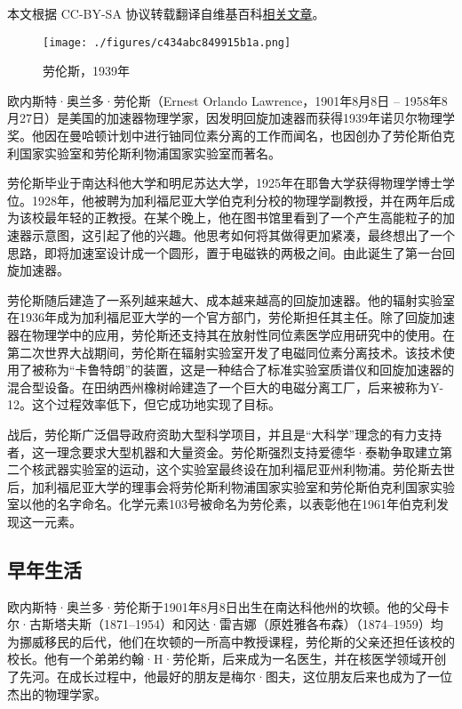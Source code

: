 
本文根据 CC-BY-SA 协议转载翻译自维基百科\href{https://en.wikipedia.org/wiki/Ernest_Lawrence}{相关文章}。

\begin{figure}[ht]
\centering
\texttt{[image: ./figures/c434abc849915b1a.png]}
\caption{劳伦斯，1939年} \label{fig_ONST_8}
\end{figure}
欧内斯特·奥兰多·劳伦斯（Ernest Orlando Lawrence，1901年8月8日 – 1958年8月27日）是美国的加速器物理学家，因发明回旋加速器而获得1939年诺贝尔物理学奖。他因在曼哈顿计划中进行铀同位素分离的工作而闻名，也因创办了劳伦斯伯克利国家实验室和劳伦斯利物浦国家实验室而著名。

劳伦斯毕业于南达科他大学和明尼苏达大学，1925年在耶鲁大学获得物理学博士学位。1928年，他被聘为加利福尼亚大学伯克利分校的物理学副教授，并在两年后成为该校最年轻的正教授。在某个晚上，他在图书馆里看到了一个产生高能粒子的加速器示意图，这引起了他的兴趣。他思考如何将其做得更加紧凑，最终想出了一个思路，即将加速室设计成一个圆形，置于电磁铁的两极之间。由此诞生了第一台回旋加速器。

劳伦斯随后建造了一系列越来越大、成本越来越高的回旋加速器。他的辐射实验室在1936年成为加利福尼亚大学的一个官方部门，劳伦斯担任其主任。除了回旋加速器在物理学中的应用，劳伦斯还支持其在放射性同位素医学应用研究中的使用。在第二次世界大战期间，劳伦斯在辐射实验室开发了电磁同位素分离技术。该技术使用了被称为“卡鲁特朗”的装置，这是一种结合了标准实验室质谱仪和回旋加速器的混合型设备。在田纳西州橡树岭建造了一个巨大的电磁分离工厂，后来被称为Y-12。这个过程效率低下，但它成功地实现了目标。

战后，劳伦斯广泛倡导政府资助大型科学项目，并且是“大科学”理念的有力支持者，这一理念要求大型机器和大量资金。劳伦斯强烈支持爱德华·泰勒争取建立第二个核武器实验室的运动，这个实验室最终设在加利福尼亚州利物浦。劳伦斯去世后，加利福尼亚大学的理事会将劳伦斯利物浦国家实验室和劳伦斯伯克利国家实验室以他的名字命名。化学元素103号被命名为劳伦素，以表彰他在1961年伯克利发现这一元素。
\subsection{早年生活}
欧内斯特·奥兰多·劳伦斯于1901年8月8日出生在南达科他州的坎顿。他的父母卡尔·古斯塔夫斯（1871–1954）和冈达·雷吉娜（原姓雅各布森）（1874–1959）均为挪威移民的后代，他们在坎顿的一所高中教授课程，劳伦斯的父亲还担任该校的校长。他有一个弟弟约翰·H·劳伦斯，后来成为一名医生，并在核医学领域开创了先河。在成长过程中，他最好的朋友是梅尔·图夫，这位朋友后来也成为了一位杰出的物理学家。

